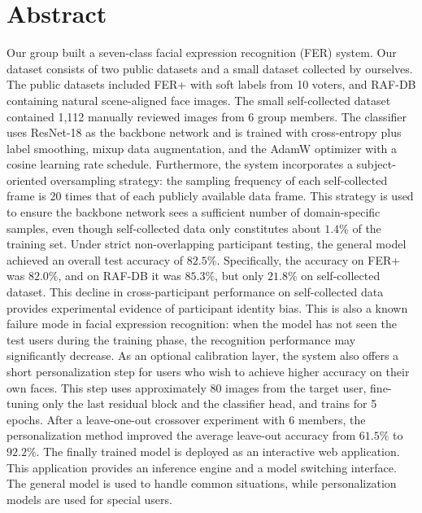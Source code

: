\documentclass[12pt,a4paper]{article}
\begin{document}
\tableofcontents
\newpage

\section{Abstract}
\label{sec:abstract}
Our group built a seven-class facial expression recognition (FER) system. Our dataset consists of two public datasets and a small dataset collected by ourselves. The public datasets included FER+ with soft labels from 10 voters, and RAF-DB containing natural scene-aligned face images. The small self-collected dataset contained 1,112 manually reviewed images from 6 group members. The classifier uses ResNet-18 as the backbone network and is trained with cross-entropy plus label smoothing, mixup data augmentation, and the AdamW optimizer with a cosine learning rate schedule. Furthermore, the system incorporates a subject-oriented oversampling strategy: the sampling frequency of each self-collected frame is 20 times that of each publicly available data frame. This strategy is used to ensure the backbone network sees a sufficient number of domain-specific samples, even though self-collected data only constitutes about $1.4\%$ of the training set. Under strict non-overlapping participant testing, the general model achieved an overall test accuracy of $82.5\%$. Specifically, the accuracy on FER+ was $82.0\%$, and on RAF-DB it was $85.3\%$, but only $21.8\%$ on self-collected dataset. This decline in cross-participant performance on self-collected data provides experimental evidence of participant identity bias. This is also a known failure mode in facial expression recognition: when the model has not seen the test users during the training phase, the recognition performance may significantly decrease. As an optional calibration layer, the system also offers a short personalization step for users who wish to achieve higher accuracy on their own faces. This step uses approximately 80 images from the target user, fine-tuning only the last residual block and the classifier head, and trains for 5 epochs. After a leave-one-out crossover experiment with 6 members, the personalization method improved the average leave-out accuracy from $61.5\%$ to $92.2\%$. The finally trained model is deployed as an interactive web application. This application provides an inference engine and a model switching interface. The general model is used to handle common situations, while personalization models are used for special users.
\end{document}
